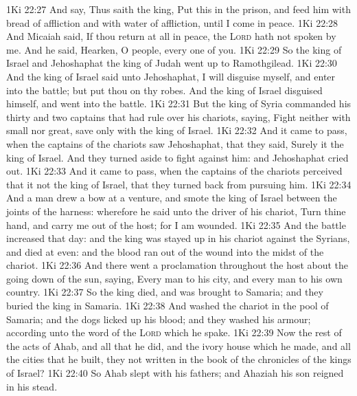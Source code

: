 \vs 1Ki 22:27 And say, Thus saith the king, Put this  in the prison, and feed him with bread of affliction and with water of affliction, until I come in peace.
\vs 1Ki 22:28 And Micaiah said, If thou return at all in peace, the \textsc{Lord} hath not spoken by me. And he said, Hearken, O people, every one of you.
\vs 1Ki 22:29 So the king of Israel and Jehoshaphat the king of Judah went up to Ramothgilead.
\vs 1Ki 22:30 And the king of Israel said unto Jehoshaphat, I will disguise myself, and enter into the battle; but put thou on thy robes. And the king of Israel disguised himself, and went into the battle.
\vs 1Ki 22:31 But the king of Syria commanded his thirty and two captains that had rule over his chariots, saying, Fight neither with small nor great, save only with the king of Israel.
\vs 1Ki 22:32 And it came to pass, when the captains of the chariots saw Jehoshaphat, that they said, Surely it  the king of Israel. And they turned aside to fight against him: and Jehoshaphat cried out.
\vs 1Ki 22:33 And it came to pass, when the captains of the chariots perceived that it  not the king of Israel, that they turned back from pursuing him.
\vs 1Ki 22:34 And a  man drew a bow at a venture, and smote the king of Israel between the joints of the harness: wherefore he said unto the driver of his chariot, Turn thine hand, and carry me out of the host; for I am wounded.
\vs 1Ki 22:35 And the battle increased that day: and the king was stayed up in his chariot against the Syrians, and died at even: and the blood ran out of the wound into the midst of the chariot.
\vs 1Ki 22:36 And there went a proclamation throughout the host about the going down of the sun, saying, Every man to his city, and every man to his own country.
\vs 1Ki 22:37 So the king died, and was brought to Samaria; and they buried the king in Samaria.
\vs 1Ki 22:38 And  washed the chariot in the pool of Samaria; and the dogs licked up his blood; and they washed his armour; according unto the word of the \textsc{Lord} which he spake.
\vs 1Ki 22:39 Now the rest of the acts of Ahab, and all that he did, and the ivory house which he made, and all the cities that he built,  they not written in the book of the chronicles of the kings of Israel?
\vs 1Ki 22:40 So Ahab slept with his fathers; and Ahaziah his son reigned in his stead.

